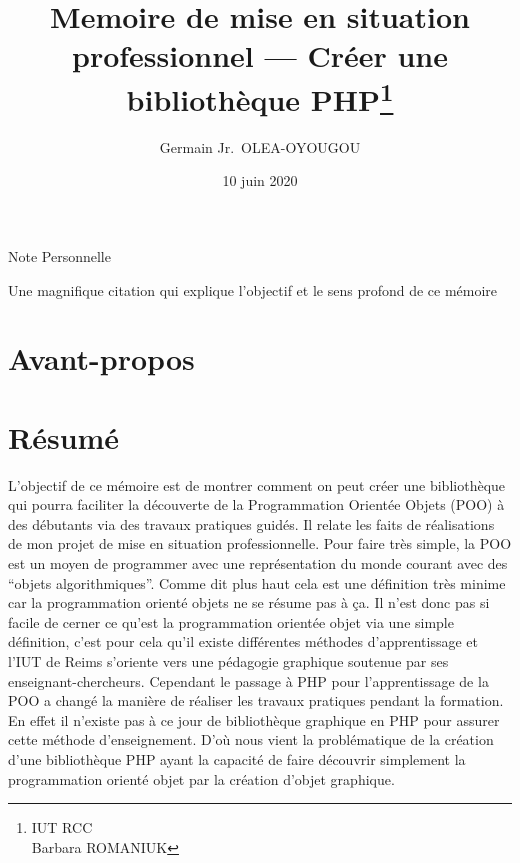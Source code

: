 \documentclass[11pt,a4paper,krantz2,11pt,oneside]{krantz}
\title{Memoire de mise en situation professionnel --- Créer une bibliothèque PHP\thanks{IUT RCC\\
Barbara ROMANIUK}}
\author{Germain Jr.~OLEA-OYOUGOU}
\date{10 juin 2020}
\begin{document}
\maketitle

\thispagestyle{empty}
\begin{center}
\Large{Note Personnelle}

\large{Une magnifique citation qui explique l'objectif et le sens profond de ce mémoire}
\end{center}

\setlength{\abovedisplayskip}{-5pt}
\setlength{\abovedisplayshortskip}{-5pt}

{
\hypersetup{linkcolor=}
\setcounter{tocdepth}{1}
\tableofcontents
}
\listoftables
\listoffigures
\hypertarget{avant-propos}{%
\chapter*{Avant-propos}\label{avant-propos}}


\mainmatter

\hypertarget{ruxe9sumuxe9}{%
\chapter*{Résumé}\label{ruxe9sumuxe9}}


L'objectif de ce mémoire est de montrer comment on peut créer une bibliothèque qui pourra faciliter la découverte de la Programmation Orientée Objets (POO) à des débutants via des travaux pratiques guidés. Il relate les faits de réalisations de mon projet de mise en situation professionnelle. Pour faire très simple, la POO est un moyen de programmer avec une représentation du monde courant avec des ``objets algorithmiques''. Comme dit plus haut cela est une définition très minime car la programmation orienté objets ne se résume pas à ça. Il n'est donc pas si facile de cerner ce qu'est la programmation orientée objet via une simple définition, c'est pour cela qu'il existe différentes méthodes d'apprentissage et l'IUT de Reims s'oriente vers une pédagogie graphique soutenue par ses enseignant-chercheurs. Cependant le passage à PHP pour l'apprentissage de la POO a changé la manière de réaliser les travaux pratiques pendant la formation. En effet il n'existe pas à ce jour de bibliothèque graphique en PHP pour assurer cette méthode d'enseignement. D'où nous vient la problématique de la création d'une bibliothèque PHP ayant la capacité de faire découvrir simplement la programmation orienté objet par la création d'objet graphique.
\end{document}
